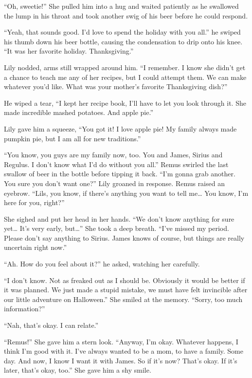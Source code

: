 \documentclass[12pt,twoside,openright]{memoir}
\begin{document}
``Oh, sweetie!'' She pulled him into a hug and waited patiently as he swallowed the lump in his throat and took another swig of his beer before he could respond. 

``Yeah, that sounds good. I'd love to spend the holiday with you all.'' he swiped his thumb down his beer bottle, causing the condensation to drip onto his knee. ``It was her favorite holiday. Thanksgiving.''

Lily nodded, arms still wrapped around him. ``I remember. I know she didn't get a chance to teach me any of her recipes, but I could attempt them. We can make whatever you'd like. What was your mother's favorite Thanksgiving dish?'' 

He wiped a tear, ``I kept her recipe book, I'll have to let you look through it. She made incredible mashed potatoes. And apple pie.''

Lily gave him a squeeze, ``You got it! I love apple pie! My family always made pumpkin pie, but I am all for new traditions.''

``You know, you guys are my family now, too. You and James, Sirius and Regulus. I don't know what I'd do without you all.'' Remus swirled the last swallow of beer in the bottle before tipping it back. ``I'm gonna grab another. You sure you don't want one?'' Lily groaned in response. Remus raised an eyebrow. ``Lils, you know, if there's anything you want to tell me… You know, I'm here for you, right?''

She sighed and put her head in her hands. ``We don't know anything for sure yet… It's very early, but…'' She took a deep breath. ``I've missed my period. Please don't say anything to Sirius. James knows of course, but things are really uncertain right now.''

``Ah. How do you feel about it?'' he asked, watching her carefully. 

``I don't know. Not as freaked out as I should be. Obviously it would be better if it was planned. We just made a stupid mistake, we must have felt invincible after our little adventure on Halloween.'' She smiled at the memory. ``Sorry, too much information?''

``Nah, that's okay. I can relate.'' 

``Remus!'' She gave him a stern look. ``Anyway, I'm okay. Whatever happens, I think I'm good with it. I've always wanted to be a mom, to have a family. Some day. And now, I know I want it with James. So if it's now? That's okay. If it's later, that's okay, too.'' She gave him a shy smile.
\end{document}
